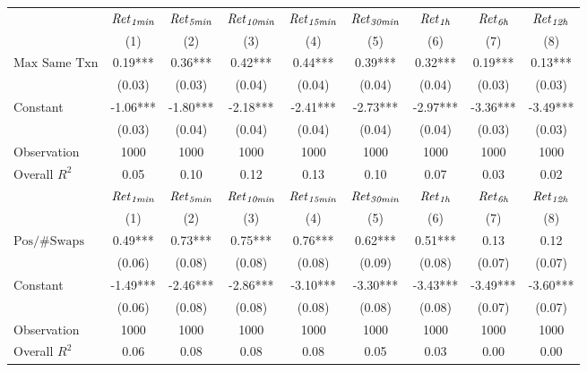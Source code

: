 \begin{tabular}{lcccccccc}
\hline
 & ${\it Ret}_{\it 1min}$ & ${\it Ret}_{\it 5min}$ & ${\it Ret}_{\it 10min}$ & ${\it Ret}_{\it 15min}$ & ${\it Ret}_{\it 30min}$ & ${\it Ret}_{\it 1h}$ & ${\it Ret}_{\it 6h}$ & ${\it Ret}_{\it 12h}$ \\
 & (1) & (2) & (3) & (4) & (5) & (6) & (7) & (8) \\
\hline
$\text{Max Same Txn}$ & 0.19*** & 0.36*** & 0.42*** & 0.44*** & 0.39*** & 0.32*** & 0.19*** & 0.13*** \\
 & (0.03) & (0.03) & (0.04) & (0.04) & (0.04) & (0.04) & (0.03) & (0.03) \\
Constant & -1.06*** & -1.80*** & -2.18*** & -2.41*** & -2.73*** & -2.97*** & -3.36*** & -3.49*** \\
 & (0.03) & (0.04) & (0.04) & (0.04) & (0.04) & (0.04) & (0.03) & (0.03) \\
Observation & 1000 & 1000 & 1000 & 1000 & 1000 & 1000 & 1000 & 1000 \\
Overall $R^2$ & 0.05 & 0.10 & 0.12 & 0.13 & 0.10 & 0.07 & 0.03 & 0.02 \\
\hline
 & ${\it Ret}_{\it 1min}$ & ${\it Ret}_{\it 5min}$ & ${\it Ret}_{\it 10min}$ & ${\it Ret}_{\it 15min}$ & ${\it Ret}_{\it 30min}$ & ${\it Ret}_{\it 1h}$ & ${\it Ret}_{\it 6h}$ & ${\it Ret}_{\it 12h}$ \\
 & (1) & (2) & (3) & (4) & (5) & (6) & (7) & (8) \\
\hline
$\text{Pos/\#Swaps}$ & 0.49*** & 0.73*** & 0.75*** & 0.76*** & 0.62*** & 0.51*** & 0.13 & 0.12 \\
 & (0.06) & (0.08) & (0.08) & (0.08) & (0.09) & (0.08) & (0.07) & (0.07) \\
Constant & -1.49*** & -2.46*** & -2.86*** & -3.10*** & -3.30*** & -3.43*** & -3.49*** & -3.60*** \\
 & (0.06) & (0.08) & (0.08) & (0.08) & (0.08) & (0.08) & (0.07) & (0.07) \\
Observation & 1000 & 1000 & 1000 & 1000 & 1000 & 1000 & 1000 & 1000 \\
Overall $R^2$ & 0.06 & 0.08 & 0.08 & 0.08 & 0.05 & 0.03 & 0.00 & 0.00 \\
\hline
\end{tabular}
